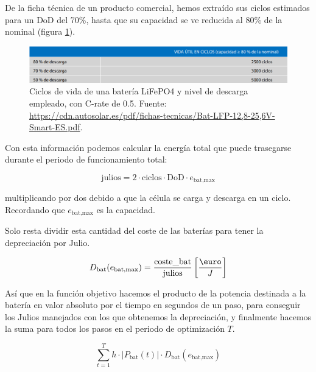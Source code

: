 De la ficha técnica de un producto comercial, hemos extraído sus ciclos
estimados para un DoD del 70\%, hasta que su capacidad se ve reducida al
80\% de la nominal (figura \ref{fig:battery_datasheet_cycles}).

\begin{figure}[h] \centering
	\centering
	\includegraphics[width=1\textwidth]{./capitulos/resultados_discusion/images/battery_datasheet_cycles.png}
	\caption{Ciclos de vida de una batería LiFePO4 y nivel de descarga empleado,
		con C-rate de 0.5. Fuente:
		\url{https://cdn.autosolar.es/pdf/fichas-tecnicas/Bat-LFP-12,8-25,6V-Smart-ES.pdf}.}
	\label{fig:battery_datasheet_cycles}
\end{figure}

Con esta información podemos calcular la energía total que puede trasegarse durante
el periodo de funcionamiento total:

\begin{equation} \label{eq:battery_life_joules}
	\text{julios} = 2 \cdot \text{ciclos} \cdot \text{DoD} \cdot e_\text{bat,max}
\end{equation}

multiplicando por dos debido a que la célula se carga y descarga en un ciclo.
Recordando que $e_\text{bat,max}$ es la capacidad.

Solo resta dividir esta cantidad del coste de las baterías para tener la depreciación
por Julio.

\begin{equation} \label{eq:battery_depreciation_by_joule}
	D_\text{bat}(e_\text{bat,max}) = \frac{\text{coste\_bat}}{\text{julios}} \left[\frac{\text{\euro}}{J}\right]
\end{equation}

Así que en la función objetivo hacemos el producto de la potencia destinada a
la batería en valor absoluto por el tiempo en segundos de un paso, para
conseguir los Julios manejados con los que obtenemos la depreciación, y
finalmente hacemos la suma para todos los pasos en el periodo de optimización $T$.

\begin{equation}
	\sum_{t=1}^{T} h \cdot |P_\text{bat}(t)| \cdot D_\text{bat}(e_\text{bat,max})
\end{equation}

